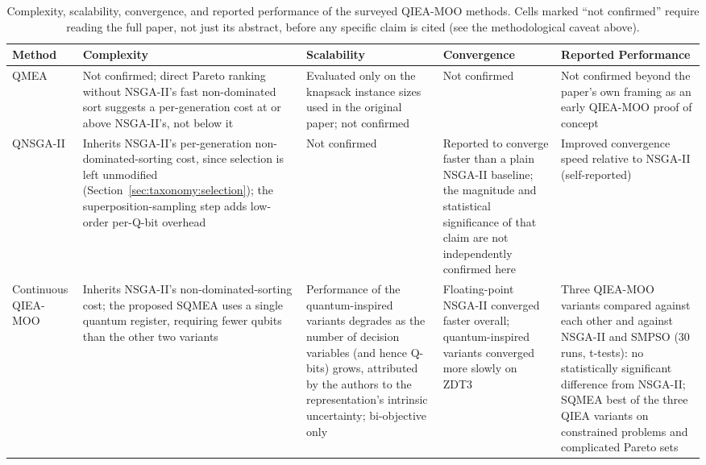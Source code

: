 \begin{table}[htbp]
  \centering
  \small
  \caption{Complexity, scalability, convergence, and reported
    performance of the surveyed QIEA-MOO methods. Cells marked
    ``not confirmed'' require reading the full paper, not just its
    abstract, before any specific claim is cited (see the methodological
    caveat above).}
  \label{tab:feature-comparison-performance}
  \begin{adjustwidth}{-2cm}{-2cm}
  \centering
  \begin{tabularx}{\linewidth}{@{}p{2.1cm}XXXX@{}}
    \toprule
    Method & Complexity & Scalability & Convergence & Reported
    Performance \\
    \midrule
    QMEA~\citep{kim2006qmea} &
      Not confirmed; direct Pareto ranking without NSGA-II's fast
      non-dominated sort suggests a per-generation cost at or above
      NSGA-II's, not below it &
      Evaluated only on the knapsack instance sizes used in the
      original paper; not confirmed &
      Not confirmed &
      Not confirmed beyond the paper's own framing as an early
      QIEA-MOO proof of concept \\
    QNSGA-II~\citep{guzel2022qnsga2} &
      Inherits NSGA-II's per-generation non-dominated-sorting cost,
      since selection is left unmodified (Section~\ref{sec:taxonomy:selection});
      the superposition-sampling step adds low-order per-Q-bit overhead &
      Not confirmed &
      Reported to converge faster than a plain NSGA-II baseline; the
      magnitude and statistical significance of that claim are not
      independently confirmed here &
      Improved convergence speed relative to NSGA-II (self-reported) \\
    Continuous QIEA-MOO~\citep{olvera2023continuous} &
      Inherits NSGA-II's non-dominated-sorting cost; the proposed SQMEA
      uses a single quantum register, requiring fewer qubits than the
      other two variants &
      Performance of the quantum-inspired variants degrades as the
      number of decision variables (and hence Q-bits) grows, attributed
      by the authors to the representation's intrinsic uncertainty;
      bi-objective only &
      Floating-point NSGA-II converged faster overall; quantum-inspired
      variants converged more slowly on ZDT3 &
      Three QIEA-MOO variants compared against each other and against
      NSGA-II and SMPSO (30 runs, t-tests): no statistically significant
      difference from NSGA-II; SQMEA best of the three QIEA variants on
      constrained problems and complicated Pareto sets \\

\end{tabularx}
\end{adjustwidth}
\end{table}
